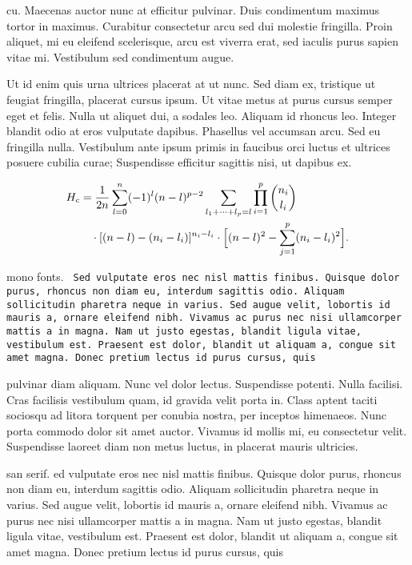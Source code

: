 \documentclass[12pt]{article} %
\begin{document}
cu. Maecenas auctor nunc at efficitur pulvinar. Duis condimentum maximus tortor in maximus. Curabitur consectetur arcu sed dui molestie fringilla. Proin aliquet, mi eu eleifend scelerisque, arcu est viverra erat, sed iaculis purus sapien vitae mi. Vestibulum sed condimentum augue.

Ut id enim quis urna ultrices placerat at ut nunc. Sed diam ex, tristique ut feugiat fringilla, placerat cursus ipsum. Ut vitae metus at purus cursus semper eget et felis. Nulla ut aliquet dui, a sodales leo. Aliquam id rhoncus leo. Integer blandit odio at eros vulputate dapibus. Phasellus vel accumsan arcu. Sed eu fringilla nulla. Vestibulum ante ipsum primis in faucibus orci luctus et ultrices posuere cubilia curae; Suspendisse efficitur sagittis nisi, ut dapibus ex.

\begin{equation}\label{e:barwq}\begin{split}
H_c&=\frac{1}{2n} \sum^n_{l=0}(-1)^{l}(n-{l})^{p-2}
\sum_{l _1+\dots+ l _p=l}\prod^p_{i=1} \binom{n_i}{l _i}\\
&\quad\cdot[(n-l )-(n_i-l _i)]^{n_i-l _i}\cdot
\Bigl[(n-l )^2-\sum^p_{j=1}(n_i-l _i)^2\Bigr].
\end{split}\end{equation}

mono fonts.
\texttt{
Sed vulputate eros nec nisl mattis finibus. Quisque dolor purus, rhoncus non diam eu, interdum
sagittis odio. Aliquam sollicitudin pharetra neque in varius. Sed augue velit, lobortis id mauris a,
ornare eleifend nibh. Vivamus ac purus nec nisi ullamcorper mattis a in magna. Nam ut justo egestas,
blandit ligula vitae, vestibulum est. Praesent est dolor, blandit ut aliquam a, congue sit amet magna.
Donec pretium lectus id purus cursus, quis}

{\ttfamily pulvinar diam aliquam. Nunc vel dolor lectus. Suspendisse potenti. Nulla facilisi. Cras
facilisis vestibulum quam, id gravida velit porta in. Class aptent taciti sociosqu ad litora torquent
per conubia nostra, per inceptos himenaeos. Nunc porta commodo dolor sit amet auctor. Vivamus id
mollis mi, eu consectetur velit. Suspendisse laoreet diam non metus luctus, in placerat mauris
ultricies.
}

san serif. \textsf{ ed vulputate eros nec nisl mattis finibus. Quisque dolor purus, rhoncus non diam
eu, interdum sagittis odio. Aliquam sollicitudin pharetra neque in varius. Sed augue velit, lobortis
id mauris a, ornare eleifend nibh. Vivamus ac purus nec nisi ullamcorper mattis a in magna. Nam ut
justo egestas, blandit ligula vitae, vestibulum est. Praesent est dolor, blandit ut aliquam a, congue
sit amet magna. Donec pretium lectus id purus cursus, quis}
\end{document}
